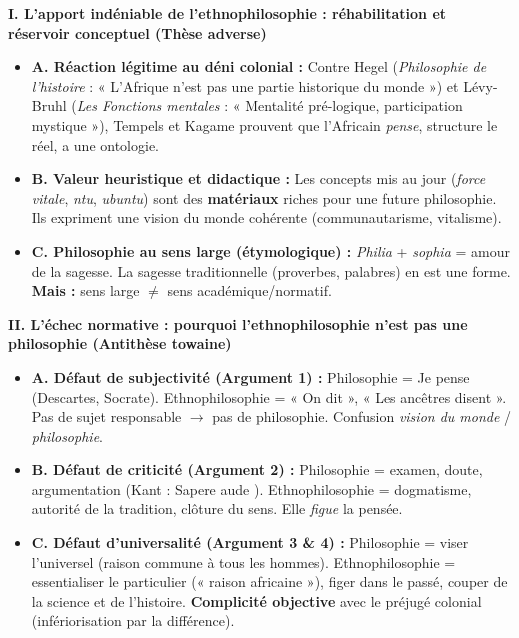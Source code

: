 \documentclass[11pt]{article}
\begin{document}
\begin{exoresolu}
\textbf{I. L'apport indéniable de l'ethnophilosophie : réhabilitation et réservoir conceptuel (Thèse adverse)}
\begin{itemize}
    \item \textbf{A. Réaction légitime au déni colonial :} Contre Hegel (\emph{Philosophie de l'histoire} : « L'Afrique n'est pas une partie historique du monde ») et Lévy-Bruhl (\emph{Les Fonctions mentales} : « Mentalité pré-logique, participation mystique »), Tempels et Kagame prouvent que l'Africain \emph{pense}, structure le réel, a une ontologie.
    \item \textbf{B. Valeur heuristique et didactique :} Les concepts mis au jour (\emph{force vitale}, \emph{ntu}, \emph{ubuntu}) sont des \textbf{matériaux} riches pour une future philosophie. Ils expriment une vision du monde cohérente (communautarisme, vitalisme).
    \item \textbf{C. Philosophie au sens large (étymologique) :} \emph{Philia} + \emph{sophia} = amour de la sagesse. La sagesse traditionnelle (proverbes, palabres) en est une forme. \textbf{Mais :} sens large $\neq$ sens académique/normatif.
\end{itemize}

\textbf{II. L'échec normative : pourquoi l'ethnophilosophie n'est pas une philosophie (Antithèse towaine)}
\begin{itemize}
    \item \textbf{A. Défaut de subjectivité (Argument 1) :} Philosophie = \guillemotleft Je pense \guillemotright (Descartes, Socrate). Ethnophilosophie = « On dit », « Les ancêtres disent ». Pas de sujet responsable $\rightarrow$ pas de philosophie. Confusion \emph{vision du monde} / \emph{philosophie}.
    \item \textbf{B. Défaut de criticité (Argument 2) :} Philosophie = examen, doute, argumentation (Kant : \guillemotleft Sapere aude \guillemotright). Ethnophilosophie = dogmatisme, autorité de la tradition, clôture du sens. Elle \emph{figue} la pensée.
    \item \textbf{C. Défaut d'universalité (Argument 3 \& 4) :} Philosophie = viser l'universel (raison commune à tous les hommes). Ethnophilosophie = essentialiser le particulier (« raison africaine »), figer dans le passé, couper de la science et de l'histoire. \textbf{Complicité objective} avec le préjugé colonial (infériorisation par la différence).
\end{itemize}


\end{exoresolu}
\end{document}
